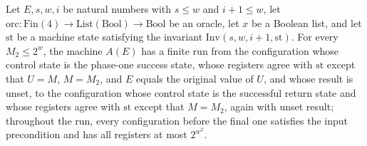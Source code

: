 \begin{theorem}
\label{Complexity.LogProg.SavitchARM.tail1T}
\leanok
{}
Let $E,s,w,i$ be natural numbers with $s\le w$ and $i+1\le w$, let
$\mathrm{orc}:\mathrm{Fin}(4)\to\mathrm{List}(\mathrm{Bool})\to\mathrm{Bool}$ be an
oracle, let $x$ be a Boolean list, and let $\mathrm{st}$ be a machine state satisfying
the invariant $\mathrm{Inv}(s,w,i+1,\mathrm{st})$. For every $M_2\le 2^w$, the machine
$A(E)$ has a finite run from the configuration whose control state is the phase-one
success state, whose registers agree with $\mathrm{st}$ except that $U=M$, $M=M_2$, and
$E$ equals the original value of $U$, and whose result is unset, to the configuration
whose control state is the successful return state and whose registers agree with
$\mathrm{st}$ except that $M=M_2$, again with unset result; throughout the run, every
configuration before the final one satisfies the input precondition and has all
registers at most $2^{w^2}$.
\end{theorem}

